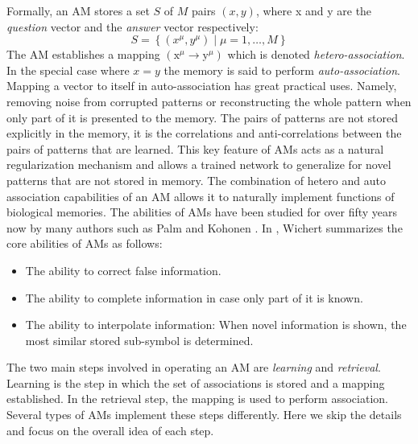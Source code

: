 \documentclass{article}
\begin{document}
Formally, an AM stores a set $S$ of $M$ pairs $(x,y)$, where x and y are the \textit{question} vector and the \textit{answer} vector respectively:
\begin{equation}
\label{eqn:S}
S=\left\{\left(x^{\mu}, y^{\mu}\right) \mid \mu=1, \ldots, M\right\}
\end{equation}
The AM establishes a mapping $\left(\mathrm{x}^{\mu} \rightarrow \mathrm{y}^{\mu}\right)$ which is denoted\textit{ hetero-association}.
In the special case where $x=y$ the memory is said to perform \textit{auto-association}. Mapping a vector to itself in auto-association has great practical uses. Namely, removing noise from corrupted patterns or reconstructing the whole pattern when only part of it is presented to the memory. The pairs of patterns are not stored explicitly in the memory, it is the correlations and anti-correlations between the pairs of patterns that are learned. This key feature of AMs acts as a natural regularization mechanism and allows a trained network to generalize for novel patterns that are not stored in memory.
The combination of hetero and auto association capabilities of an AM allows it to naturally implement functions of biological memories. The abilities of AMs have been studied for over fifty years now by many authors such as Palm \cite{palm1980associative} and Kohonen \cite{kohonen2012self}. In \cite{wichert2020principles}, Wichert summarizes the core abilities of AMs as follows:
\begin{itemize}
    \item The ability to correct false information.
    \item The ability to complete information in case only part of it is known.
    \item The ability to interpolate information: When novel information is shown, the most similar stored sub-symbol is determined.
\end{itemize}

The two main steps involved in operating an AM are \textit{learning} and \textit{retrieval}. Learning is the step in which the set of associations is stored and a mapping established. In the retrieval step, the mapping is used to perform association. Several types of AMs implement these steps differently. Here we skip the details and focus on the overall idea of each step.
\end{document}
